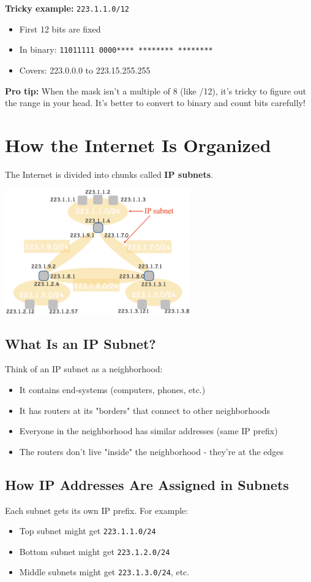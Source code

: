 \documentclass[../../compsys.tex]{subfiles}
\begin{document}
\textbf{Tricky example:} \texttt{223.1.1.0/12}
\begin{itemize}
    \item First 12 bits are fixed
    \item In binary: \texttt{11011111\ 0000****\ ********\ ********}
    \item Covers: 223.0.0.0 to 223.15.255.255
\end{itemize}

\textbf{Pro tip:} When the mask isn't a multiple of 8 (like /12), it's tricky to figure out the range in your head. It's better to convert to binary and count bits carefully!

\section{How the Internet Is Organized}
The Internet is divided into chunks called \textbf{IP subnets}.

\begin{center}
    \includegraphics[width=0.6\textwidth]{images/subnets.png}
\end{center}

\subsection{What Is an IP Subnet?}
Think of an IP subnet as a neighborhood:
\begin{itemize}
    \item It contains end-systems (computers, phones, etc.)
    \item It has routers at its "borders" that connect to other neighborhoods
    \item Everyone in the neighborhood has similar addresses (same IP prefix)
    \item The routers don't live "inside" the neighborhood - they're at the edges
\end{itemize}

\subsection{How IP Addresses Are Assigned in Subnets}
Each subnet gets its own IP prefix. For example:
\begin{itemize}
    \item Top subnet might get \texttt{223.1.1.0/24}
    \item Bottom subnet might get \texttt{223.1.2.0/24}
    \item Middle subnets might get \texttt{223.1.3.0/24}, etc.
\end{itemize}
\end{document}
